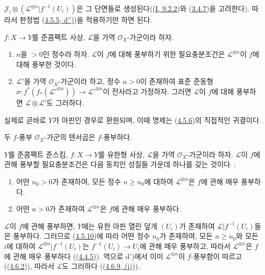 
$\mathcal{J}_i\otimes(\mathcal{L}^{\otimes n}|f^{-1}(U_i))$은 그
단면들로 생성된다((\hyperref[I.9.2.2-ko]{I, 9.2.2})와
(\hyperref[II.3.4.7-ko]{3.4.7})을 고려한다). 따라서 판정법
(\hyperref[II.4.5.5-ko]{4.5.5, d'')})을 적용하기만 하면 된다.

\begin{proposition}[4.6.9]
\label{II.4.6.9-ko}
$f:X\to Y$를 준콤팩트 사상, $\mathcal{L}$을 가역
$\mathcal{O}_X$-가군이라 하자.
\begin{enumerate}
  \item[\rm{(i)}] $n$을 $>0$인 정수라 하자. $\mathcal{L}$이 $f$에 대해
  풍부하기 위한 필요충분조건은 $\mathcal{L}^{\otimes n}$이 $f$에 대해
  풍부한 것이다.
  \item[\rm{(ii)}] $\mathcal{L}'$을 가역 $\mathcal{O}_X$-가군이라 하고,
  정수 $n>0$이 존재하여 표준 준동형
  $\sigma:f^*(f_*(\mathcal{L}'^{\otimes n}))\to
  \mathcal{L}'^{\otimes n}$이 전사라고 가정하자. 그러면
  $\mathcal{L}$이 $f$에 대해 풍부하면
  $\mathcal{L}\otimes\mathcal{L}'$도 그러하다.
\end{enumerate}
\end{proposition}

실제로 곧바로 $Y$가 아핀인 경우로 환원되며, 이때 명제는
(\hyperref[II.4.5.6-ko]{4.5.6})의 직접적인 귀결이다.

\begin{corollary}[4.6.10]
\label{II.4.6.10-ko}
두 $f$-풍부 $\mathcal{O}_X$-가군의 텐서곱은 $f$-풍부하다.
\end{corollary}

\begin{proposition}[4.6.11]
\label{II.4.6.11-ko}
$Y$를 준콤팩트 준스킴, $f:X\to Y$를 유한형 사상,
$\mathcal{L}$을 가역 $\mathcal{O}_X$-가군이라 하자.
$\mathcal{L}$이 $f$에 관해 풍부할 필요충분조건은 다음 동치인
성질들 가운데 하나를 갖는 것이다~:
\begin{enumerate}
  \item[\rm{d)}] 어떤 $n_0>0$가 존재하여, 모든 정수 $n\geq n_0$에
  대하여 $\mathcal{L}^{\otimes n}$은 $f$에 관해 매우 풍부하다.
  \item[\rm{d')}] 어떤 $n>0$가 존재하여
  $\mathcal{L}^{\otimes n}$은 $f$에 관해 매우 풍부하다.
\end{enumerate}
\end{proposition}

$\mathcal{L}$이 $f$에 관해 풍부하면, $Y$에는 유한 아핀 열린 덮개
$(U_i)$가 존재하여 $\mathcal{L}|f^{-1}(U_i)$들은 풍부하다.
그러므로 (\hyperref[II.4.5.10-ko]{4.5.10})에 따라 어떤 정수 $n_0$가
존재하여, 모든 $n\geq n_0$와 모든 $i$에 대하여
$\mathcal{L}^{\otimes n}|f^{-1}(U_i)$는
$f^{-1}(U_i)\to U_i$에 관해 매우 풍부하고, 따라서
$\mathcal{L}^{\otimes n}$은 $f$에 관해 매우 풍부하다
((\hyperref[II.4.4.5-ko]{4.4.5})). 역으로 d')에서 이미
$\mathcal{L}^{\otimes n}$이 $f$-풍부함이 따르고
((\hyperref[II.4.6.2-ko]{4.6.2})), 따라서 $\mathcal{L}$도 그러하다
((\hyperref[II.4.6.9-ko]{4.6.9, (i)})).

